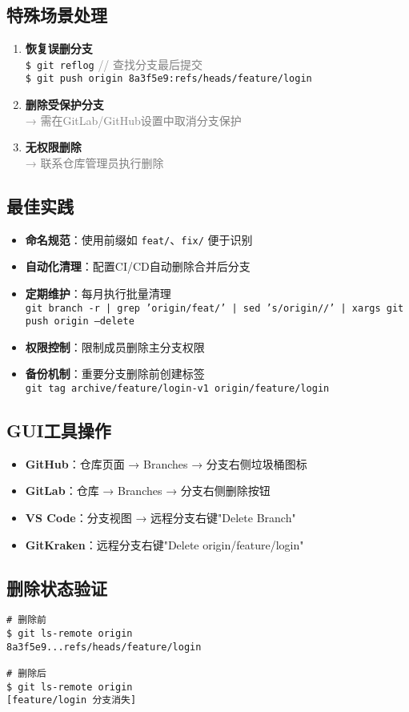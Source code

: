 \subsection{特殊场景处理}
\begin{enumerate}[leftmargin=*, nosep]
    \item \textbf{恢复误删分支} \\
    \texttt{\$ git reflog} \quad \textcolor{gray}{// 查找分支最后提交} \\
    \texttt{\$ git push origin 8a3f5e9:refs/heads/feature/login}
    
    \item \textbf{删除受保护分支} \\
    \textcolor{gray}{→ 需在GitLab/GitHub设置中取消分支保护}
    
    \item \textbf{无权限删除} \\
    \textcolor{gray}{→ 联系仓库管理员执行删除}
\end{enumerate}

\subsection{最佳实践}
\begin{itemize}[leftmargin=*, nosep]
    \item \textbf{命名规范}：使用前缀如 \texttt{feat/}、\texttt{fix/} 便于识别
    \item \textbf{自动化清理}：配置CI/CD自动删除合并后分支
    \item \textbf{定期维护}：每月执行批量清理 \\
    \texttt{git branch -r | grep 'origin/feat/' | sed 's/origin\///' | xargs git push origin --delete}
    
    \item \textbf{权限控制}：限制成员删除主分支权限
    \item \textbf{备份机制}：重要分支删除前创建标签 \\
    \texttt{git tag archive/feature/login-v1 origin/feature/login}
\end{itemize}

\subsection{GUI工具操作}
\begin{itemize}[leftmargin=*, nosep]
    \item \textbf{GitHub}：仓库页面 → Branches → 分支右侧垃圾桶图标
    \item \textbf{GitLab}：仓库 → Branches → 分支右侧删除按钮
    \item \textbf{VS Code}：分支视图 → 远程分支右键"Delete Branch"
    \item \textbf{GitKraken}：远程分支右键"Delete origin/feature/login"
\end{itemize}

\subsection{删除状态验证}
\begin{verbatim}
# 删除前
$ git ls-remote origin
8a3f5e9...refs/heads/feature/login

# 删除后
$ git ls-remote origin
[feature/login 分支消失]
\end{verbatim}